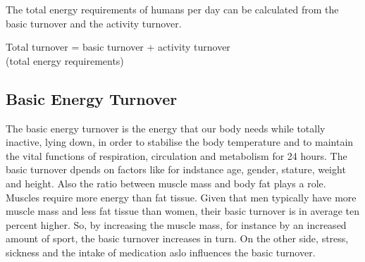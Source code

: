 \documentclass[../main.tex]{subfiles}
\begin{document}
The total energy requirements of humans per day can be calculated from the basic turnover and the activity turnover.

\vspace{2mm}

\begin{center}
\begin{fminipage}{8cm}
  Total turnover  = basic turnover + activity turnover \\
  (total energy requirements)
\end{fminipage}
\end{center}

\vspace{2mm}

\subsection{Basic Energy Turnover}

The basic energy turnover is the energy that our body needs while totally inactive, lying down, in order to
stabilise the body temperature and to maintain the vital functions of respiration, circulation and metabolism for 24 hours.
The basic turnover dpends on factors like for indstance age, gender, stature, weight and height.
Also the ratio between muscle mass and body fat plays a role.
Muscles require more energy than fat tissue.
Given that men typically have more muscle mass and less fat tissue than women, their basic turnover is in average ten percent higher.
So, by increasing the muscle mass, for instance by an increased amount of sport, the basic turnover increases in turn.
On the other side, stress, sickness and the intake of medication aslo influences the basic turnover.
\end{document}
